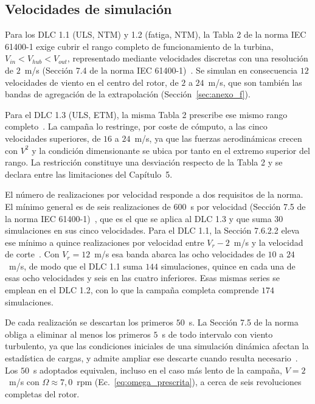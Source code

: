 \subsection{Velocidades de simulación}
\label{sec:velocidades_simulacion}

Para los DLC 1.1 (ULS, NTM) y 1.2 (fatiga, NTM), la Tabla 2 de la norma IEC 61400-1 exige cubrir el rango completo de funcionamiento de la turbina, $V_{in} < V_{hub} < V_{out}$, representado mediante velocidades discretas con una resolución de $2$~m/s (Sección 7.4 de la norma IEC 61400-1)~\parencite*{IEC61400-1}. Se simulan en consecuencia $12$ velocidades de viento en el centro del rotor, de $2$ a $24$~m/s, que son también las bandas de agregación de la extrapolación (Sección~\ref{sec:anexo_f}).

Para el DLC 1.3 (ULS, ETM), la misma Tabla 2 prescribe ese mismo rango completo~\parencite{IEC61400-1}. La campaña lo restringe, por coste de cómputo, a las cinco velocidades superiores, de $16$ a $24$~m/s, ya que las fuerzas aerodinámicas crecen con $V^2$ y la condición dimensionante se ubica por tanto en el extremo superior del rango. La restricción constituye una desviación respecto de la Tabla 2 y se declara entre las limitaciones del Capítulo~5.

El número de realizaciones por velocidad responde a dos requisitos de la norma. El mínimo general es de seis realizaciones de $600$~s por velocidad (Sección 7.5 de la norma IEC 61400-1)~\parencite*{IEC61400-1}, que es el que se aplica al DLC 1.3 y que suma $30$ simulaciones en sus cinco velocidades. Para el DLC 1.1, la Sección 7.6.2.2 eleva ese mínimo a quince realizaciones por velocidad entre $V_r - 2$~m/s y la velocidad de corte~\parencite{IEC61400-1}. Con $V_r = 12$~m/s esa banda abarca las ocho velocidades de $10$ a $24$~m/s, de modo que el DLC 1.1 suma $144$ simulaciones, quince en cada una de esas ocho velocidades y seis en las cuatro inferiores. Esas mismas series se emplean en el DLC 1.2, con lo que la campaña completa comprende $174$ simulaciones.

De cada realización se descartan los primeros $50$~s. La Sección 7.5 de la norma obliga a eliminar al menos los primeros $5$~s de todo intervalo con viento turbulento, ya que las condiciones iniciales de una simulación dinámica afectan la estadística de cargas, y admite ampliar ese descarte cuando resulta necesario~\parencite{IEC61400-1}. Los $50$~s adoptados equivalen, incluso en el caso más lento de la campaña, $V = 2$~m/s con $\Omega \approx 7{,}0$~rpm (Ec.~\ref{eq:omega_prescrita}), a cerca de seis revoluciones completas del rotor.



